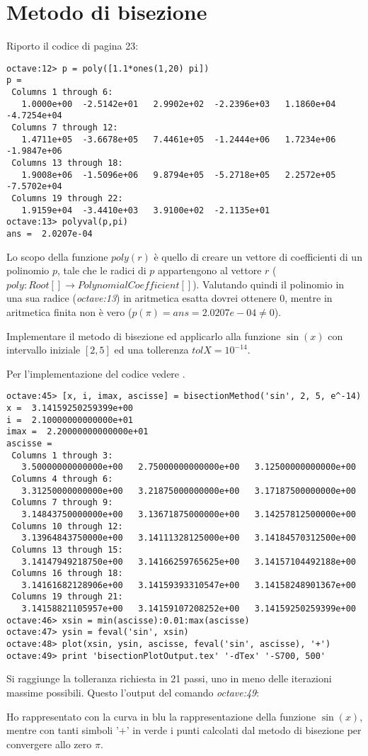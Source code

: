 \section{Metodo di bisezione}
\label{sec:metodoDiBisezione}
Riporto il codice di pagina 23:
\begin{lstlisting}
octave:12> p = poly([1.1*ones(1,20) pi])
p =
 Columns 1 through 6:
   1.0000e+00  -2.5142e+01   2.9902e+02  -2.2396e+03   1.1860e+04  -4.7254e+04
 Columns 7 through 12:
   1.4711e+05  -3.6678e+05   7.4461e+05  -1.2444e+06   1.7234e+06  -1.9847e+06
 Columns 13 through 18:
   1.9008e+06  -1.5096e+06   9.8794e+05  -5.2718e+05   2.2572e+05  -7.5702e+04
 Columns 19 through 22:
   1.9159e+04  -3.4410e+03   3.9100e+02  -2.1135e+01
octave:13> polyval(p,pi)
ans =  2.0207e-04
\end{lstlisting}
Lo scopo della funzione $poly(r)$ \`e quello di creare un vettore di coefficienti
di un polinomio $p$, tale che le radici di $p$ appartengono al vettore $r$ 
($poly: Root[] \rightarrow PolynomialCoefficient[]$).
Valutando quindi il polinomio in una sua radice (\emph{octave:13}) in aritmetica
esatta dovrei ottenere 0, mentre in aritmetica finita non \`e vero 
($p(\pi) = ans =  2.0207e-04 \not = 0$).

\begin{exercise}
Implementare il metodo di bisezione ed applicarlo alla funzione $\sin(x)$ 
con intervallo iniziale $[2, 5]$ ed una tollerenza $tolX = 10^{-14}$.
\end{exercise}
Per l'implementazione del codice vedere .
\begin{lstlisting}
octave:45> [x, i, imax, ascisse] = bisectionMethod('sin', 2, 5, e^-14)
x =  3.14159250259399e+00
i =  2.10000000000000e+01
imax =  2.20000000000000e+01
ascisse =
 Columns 1 through 3:
   3.50000000000000e+00   2.75000000000000e+00   3.12500000000000e+00
 Columns 4 through 6:
   3.31250000000000e+00   3.21875000000000e+00   3.17187500000000e+00
 Columns 7 through 9:
   3.14843750000000e+00   3.13671875000000e+00   3.14257812500000e+00
 Columns 10 through 12:
   3.13964843750000e+00   3.14111328125000e+00   3.14184570312500e+00
 Columns 13 through 15:
   3.14147949218750e+00   3.14166259765625e+00   3.14157104492188e+00
 Columns 16 through 18:
   3.14161682128906e+00   3.14159393310547e+00   3.14158248901367e+00
 Columns 19 through 21:
   3.14158821105957e+00   3.14159107208252e+00   3.14159250259399e+00
octave:46> xsin = min(ascisse):0.01:max(ascisse)
octave:47> ysin = feval('sin', xsin)
octave:48> plot(xsin, ysin, ascisse, feval('sin', ascisse), '+')
octave:49> print 'bisectionPlotOutput.tex' '-dTex' '-S700, 500'
\end{lstlisting}
Si raggiunge la tolleranza richiesta in 21 passi, uno in meno delle iterazioni
massime possibili. Questo l'output del comando \emph{octave:49}:
\begin{center}

\end{center}
Ho rappresentato con la curva in blu la rappresentazione della funzione 
$\sin(x)$, mentre con tanti simboli '$+$' in verde i punti calcolati dal
metodo di bisezione per convergere allo zero $\pi$.

